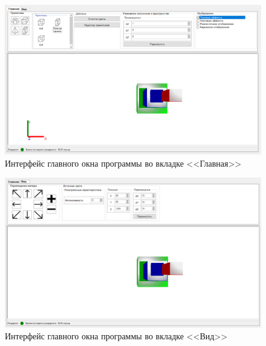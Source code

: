 \begin{figure}[h] 
	\centering
	\includegraphics[width=1\textwidth]{images/main-interface.png}
	\caption{Интерфейс главного окна программы во вкладке <<Главная>>} 
	\label{fig:main-interface} 
\end{figure}

\begin{figure}[h] 
	\centering
	\includegraphics[width=1\textwidth]{images/view-interface.png}
	\caption{Интерфейс главного окна программы во вкладке <<Вид>>} 
	\label{fig:view-interface} 
\end{figure}

\clearpage

